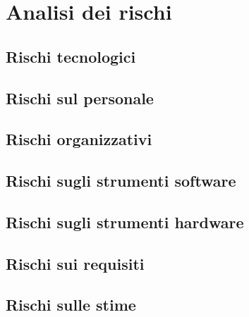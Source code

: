 \section{Analisi dei rischi}

\subsection{Rischi tecnologici}

\subsection{Rischi sul personale}

\subsection{Rischi organizzativi}

\subsection{Rischi sugli strumenti software}

\subsection{Rischi sugli strumenti hardware}

\subsection{Rischi sui requisiti}

\subsection{Rischi sulle stime}


